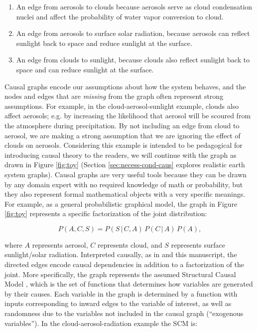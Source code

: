 \documentclass[12pt]{article}
\begin{document}
\begin{enumerate}
\item An edge from aerosols to clouds because aerosols serve as cloud
  condensation nuclei and affect the probability of water vapor
  conversion to cloud.
\item An edge from aerosols to surface solar radiation, because
  aerosols can reflect sunlight back to space and reduce sunlight
  at the surface.
\item An edge from clouds to sunlight, because clouds also reflect
  sunlight back to space and can reduce sunlight at the surface.
\end{enumerate}

Causal graphs encode our assumptions about how the system behaves, and
the nodes and edges that are \textit{missing} from the graph often
represent strong assumptions. For example, in the
cloud-aerosol-sunlight example, clouds also affect aerosols; e.g. by
increasing the likelihood that aerosol will be scoured from the
atmosphere during precipitation. By not including an edge from cloud
to aerosol, we are making a strong assumption that we are ignoring the
effect of clouds on aerosols. Considering this example is intended to
be pedagogical for introducing causal theory to the readers, we will
continue with the graph as drawn in Figure \ref{fig:toy} (Section
\ref{sec:necess-cond-caus} explores realistic earth system graphs). Causal
graphs are very useful tools because they can be drawn by any domain
expert with no required knowledge of math or probability, but they
also represent formal mathematical objects with a very specific
meanings. For example, as a general probabilistic graphical model, the
graph in Figure \ref{fig:toy} represents a specific factorization of
the joint distribution:

\begin{equation}
  P(A, C, S) = P(S \, | \,C, A) \, P(C \, | \, A) \, P(A),
\end{equation}

where $A$ represents aerosol, $C$ represents cloud, and $S$
represents surface sunlight/solar radiation. Interpreted causally, as
in \citet{pearl1995causal} and this manuscript, the directed edges
encode causal dependencies in addition to a factorization of the
joint. More specifically, the graph represents the assumed Structural
Causal Model \citep[SCM,][]{pearl2009}, which is the set of functions
that determines how variables are generated by their causes. Each
variable in the graph is determined by a function with inputs
corresponding to inward edges to the variable of interest, as well as
randomness due to the variables not included in the causal graph
(``exogenous variables'').  In the cloud-aerosol-radiation example the
SCM is:
\end{document}
